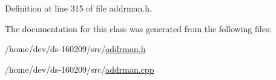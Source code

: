 Definition at line 315 of file addrman.\+h.



The documentation for this class was generated from the following files\+:\begin{DoxyCompactItemize}
\item 
/home/dev/ds-\/160209/src/\hyperlink{addrman_8h}{addrman.\+h}\item 
/home/dev/ds-\/160209/src/\hyperlink{addrman_8cpp}{addrman.\+cpp}\end{DoxyCompactItemize}
